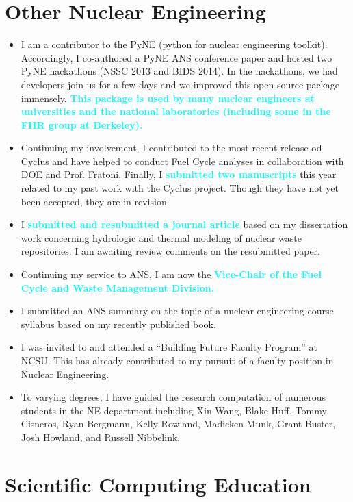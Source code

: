 \documentclass[a4paper, 10pt]{article}
\newcommand{\myitem}[1]{\item[\textcolor{gray}{\textbf{#1}}]}
\newcommand{\boldblue}[1]{\textcolor{cyan}{\textbf{#1}}}
\begin{document}
\section*{Other Nuclear Engineering}
\begin{itemize}
\myitem{PyNE} I am a contributor to the PyNE (python for nuclear engineering 
toolkit). Accordingly, I co-authored a PyNE ANS conference paper 
\cite{bates_pyne_2014} and hosted two PyNE hackathons (NSSC 2013 and BIDS 
2014). In the hackathons, we had developers join us for a few days and we 
improved this open source package immensely. \boldblue{This package is used by many 
nuclear engineers at universities and the national laboratories (including some 
in the FHR group at Berkeley).}
\myitem{Cyclus} Continuing my involvement, I contributed to the most recent 
release od Cyclus and have helped to conduct Fuel Cycle analyses in 
collaboration with DOE and Prof. Fratoni. Finally, I \boldblue{submitted two 
manuscripts} this year related to my past work with the Cyclus project. Though 
they have not yet been accepted, they are in revision.
\myitem{Cyder} I \boldblue{submitted and resubmitted a journal article} based 
on my dissertation work concerning hydrologic and thermal modeling of nuclear 
waste repositories. 
I am awaiting review comments on the resubmitted paper.
\myitem{FCWMD Vice-Chair} Continuing my service to ANS, I am now the 
\boldblue{Vice-Chair of the Fuel Cycle and Waste Management Division.}
\myitem{Conference Papers} I submitted an ANS summary on the topic of 
a nuclear engineering course syllabus based on my recently published book.
\myitem{BFF Program} I was invited to and attended a ``Building Future Faculty
Program'' at NCSU. This has already contributed to my pursuit of a faculty 
position in Nuclear Engineering.
\myitem{Mentorship} To varying degrees, I have guided the research computation 
of numerous students in the NE department including Xin Wang, Blake Huff, Tommy 
Cisneros, Ryan Bergmann, Kelly Rowland, Madicken Munk, Grant Buster, Josh 
Howland, and Russell Nibbelink. 
\end{itemize}


\section*{Scientific Computing Education}
\end{document}
